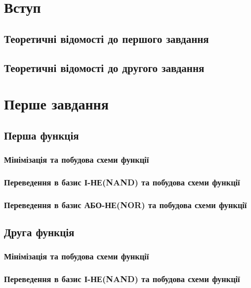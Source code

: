 \chapter{Вступ}
\section{Теоретичні відомості до першого завдання}

\section{Теоретичні відомості до другого завдання}

\chapter{Перше завдання}
\section{Перша функція}

\subsection{Мінімізація та побудова схеми функції}

\subsection{Переведення в базис І-НЕ(NAND) та побудова схеми функції}
 
\subsection{Переведення в базис АБО-НЕ(NOR) та побудова схеми функції}
 
\section{Друга функція}

\subsection{Мінімізація та побудова схеми функції}

\subsection{Переведення в базис І-НЕ(NAND) та побудова схеми функції}
 
